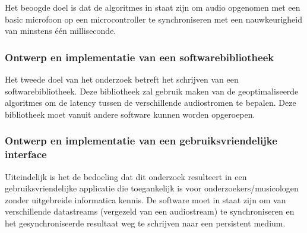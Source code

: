 Het beoogde doel is dat de algoritmes in staat zijn om audio opgenomen met een basic microfoon op een microcontroller te synchroniseren met een nauwkeurigheid van minstens één milliseconde.

\subsubsection{Ontwerp en implementatie van een softwarebibliotheek}
Het tweede doel van het onderzoek betreft het schrijven van een softwarebibliotheek. Deze bibliotheek zal gebruik maken van de geoptimaliseerde algoritmes om de latency tussen de verschillende audiostromen te bepalen. Deze bibliotheek moet vanuit andere software kunnen worden opgeroepen.

\subsubsection{Ontwerp en implementatie van een gebruiksvriendelijke interface}
\label{target-ui}

Uiteindelijk is het de bedoeling dat dit onderzoek resulteert in een gebruiksvriendelijke applicatie die toegankelijk is voor onderzoekers/musicologen zonder uitgebreide informatica kennis. De software moet in staat zijn om van verschillende datastreams (vergezeld van een audiostream) te synchroniseren en het gesynchroniseerde resultaat weg te schrijven naar een persistent medium.
